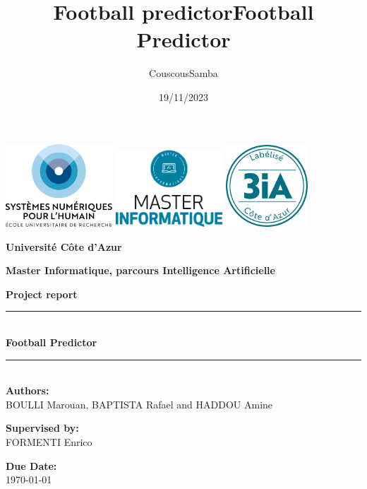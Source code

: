 \documentclass[a4paper,12pt]{article}
\title{Football predictor}
\title{\huge\bf Football Predictor}
\date{19/11/2023}
\author{CouscousSamba}
\begin{document}
\begin{titlepage}
    \begin{center}
        \includegraphics[width=0.3\textwidth]{images/DS4HlogocouleurFR.png} \hfill
        \includegraphics[width=0.3\textwidth]{images/logo_master.png} \hfill
        \includegraphics[width=0.23\textwidth]{images/tampon-3IA.png}
        
        \vspace{1.5cm}
        
        \textbf{\LARGE Université C\^ote d'Azur}
        
        \vspace{0.5cm}
        
        \textbf{\Large Master Informatique, parcours Intelligence Artificielle}
        
        \vspace{1.5cm}
        
        \textbf{\Large Project report}
        
        \vspace{0.5cm}
        
        \rule{\linewidth}{0.5mm} \\[0.4cm]
        {\LARGE \bfseries Football Predictor \\[0.2cm]}
        \rule{\linewidth}{0.5mm} \\[1.5cm]
        
        \textbf{Authors:} \\
        BOULLI Marouan, BAPTISTA Rafael and HADDOU Amine   \\
        
        \vspace{0.8cm}
        
        \textbf{Supervised by:} \\
        FORMENTI Enrico\\
        
        \vspace{1.5cm}
        
        \textbf{Due Date:} \\
        \today
        
    \end{center}
\end{titlepage}
\end{document}
